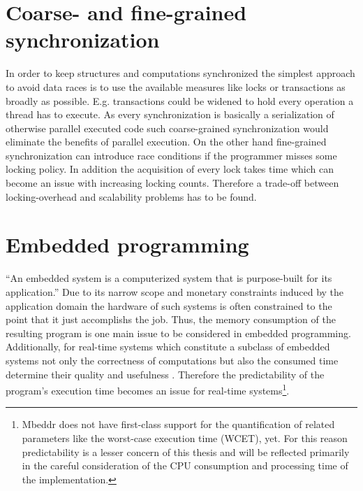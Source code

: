 \section{Coarse- and fine-grained synchronization}
In order to keep structures and computations synchronized the simplest approach to avoid data races is to use the available measures like locks or transactions as broadly as possible. E.g. transactions could be widened to hold every operation a thread has to execute. As every synchronization is basically a serialization of otherwise parallel executed code such coarse-grained synchronization would eliminate the benefits of parallel execution. On the other hand fine-grained synchronization can introduce race conditions if the programmer misses some locking policy. In addition the acquisition of every lock takes time which can become an issue with increasing locking counts. Therefore a trade-off between locking-overhead and scalability problems has to be found\cite[pp.~1-2]{PrinciplesOfTransactionalMemory}.

\section{Embedded programming}
``An embedded system is a computerized system that is purpose-built for its application.''\cite[p.~1]{MakingEmbeddedSystems} Due to its narrow scope and monetary constraints induced by the application domain the hardware of such systems is often constrained to the point that it just accomplishs the job\cite{MakingEmbeddedSystems}. Thus, the memory consumption of the resulting program is one main issue to be considered in embedded programming. Additionally, for real-time systems which constitute a subclass of embedded systems not only the correctness of computations but also the consumed time determine their quality and usefulness \cite[pp.~1-2]{SoftReal-TimeSystems}. Therefore the predictability of the program's execution time becomes an issue for real-time systems\footnote{Mbeddr does not have first-class support for the quantification of related parameters like the worst-case execution time (WCET)\cite[p.~8]{SoftReal-TimeSystems}, yet. For this reason predictability is a lesser concern of this thesis and will be reflected primarily in the careful consideration of the CPU consumption and processing time of the implementation.}.

